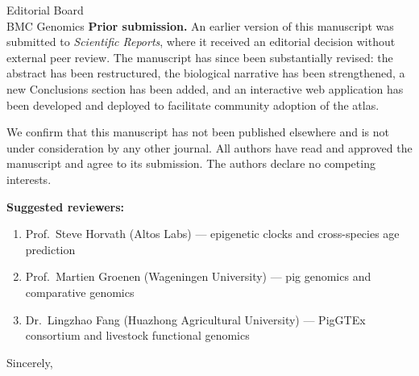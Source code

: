 \documentclass[11pt,a4paper]{letter}
\begin{document}
\begin{letter}{Editorial Board\\BMC Genomics}
\textbf{Prior submission.} An earlier version of this manuscript was submitted to \textit{Scientific Reports}, where it received an editorial decision without external peer review. The manuscript has since been substantially revised: the abstract has been restructured, the biological narrative has been strengthened, a new Conclusions section has been added, and an interactive web application has been developed and deployed to facilitate community adoption of the atlas.

We confirm that this manuscript has not been published elsewhere and is not under consideration by any other journal. All authors have read and approved the manuscript and agree to its submission. The authors declare no competing interests.

\textbf{Suggested reviewers:}
\begin{enumerate}
\item Prof.\ Steve Horvath (Altos Labs) --- epigenetic clocks and cross-species age prediction
\item Prof.\ Martien Groenen (Wageningen University) --- pig genomics and comparative genomics
\item Dr.\ Lingzhao Fang (Huazhong Agricultural University) --- PigGTEx consortium and livestock functional genomics
\end{enumerate}

\closing{Sincerely,}

\end{letter}
\end{document}
